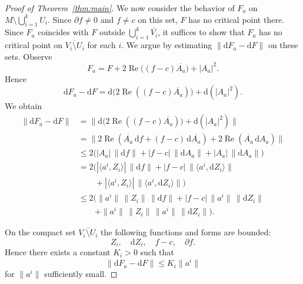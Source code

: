 \documentclass[11pt]{amsart}
\theoremstyle{plain}
\theoremstyle{definition}
\theoremstyle{remark}
\numberwithin{equation}{section}
\begin{document}
\begin{proof}[Proof of Theorem~\ref{thm:main}]
    We now consider the behavior of $F_a$ on $M \setminus \bigcup_{i=1}^{k} U_i$.
    Since $\partial f \neq 0$ and $f \neq c$ on this set, $F$ has no critical point there.
    Since $F_a$ coincides with $F$ outside $\bigcup_{i=1}^{k} \overline{V_i}$, it suffices to show that $F_a$ has no critical point on $\overline{V_i \setminus U_i}$ for each $i$.
    We argue by estimating $\|\mathrm{d}F_a - \mathrm{d}F\|$ on these sets.
    Observe
    \begin{equation}
        F_a = F + 2\operatorname{Re}\bigl( (f-c)\overline{A_a} \bigr) + |A_a|^2.
    \end{equation}
    Hence
    \begin{equation}
        \mathrm{d}F_a - \mathrm{d}F = \mathrm{d}\bigl( 2\operatorname{Re}((f-c)\overline{A_a}) \bigr) + \mathrm{d}(|A_a|^2).
    \end{equation}
    We obtain
    \begin{equation}
        \begin{aligned}
            \|\mathrm{d}F_a - \mathrm{d}F\| &= \bigl\| \mathrm{d}\bigl( 2\operatorname{Re}((f-c)\overline{A_a}) \bigr) + \mathrm{d}(|A_a|^2) \bigr\| \\
            &= \bigl\| 2\operatorname{Re}(\overline{A_a}\,\mathrm{d}f + (f-c)\,\mathrm{d}\overline{A_a}) + 2\operatorname{Re}(\overline{A_a}\,\mathrm{d}A_a) \bigr\| \\
            &\le 2 \bigl( |A_a|\,\|\mathrm{d}f\| + |f-c|\,\|\mathrm{d}A_a\| + |A_a|\,\|\mathrm{d}A_a\| \bigr) \\
            &= 2 \bigl( |\langle a^i, Z_i \rangle|\,\|\mathrm{d}f\| + |f-c|\,\|\langle a^i, \mathrm{d}Z_i \rangle\| \\
            &\qquad {}+ |\langle a^i, Z_i \rangle|\,\|\langle a^i, \mathrm{d}Z_i \rangle\| \bigr) \\
            &\le 2 \bigl( \|a^i\|\,\|Z_i\|\,\|\mathrm{d}f\| + |f-c|\,\|a^i\|\,\|\mathrm{d}Z_i\| \\
            &\qquad {}+ \|a^i\|\,\|Z_i\|\,\|a^i\|\,\|\mathrm{d}Z_i\| \bigr).
        \end{aligned}
    \end{equation}

    On the compact set $\overline{V_i \setminus U_i}$ the following functions and forms are bounded:
    \begin{equation}
        Z_i, \quad \mathrm{d}Z_i, \quad f-c, \quad \partial f.
    \end{equation}
    Hence there exists a constant $K_i > 0$ such that
    \begin{equation}
        \|\mathrm{d}F_a - \mathrm{d}F\| \le K_i \|a^i\|
    \end{equation}
    for $\|a^i\|$ sufficiently small.


\end{proof}
\end{document}
